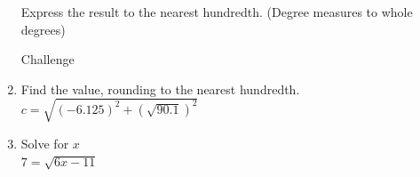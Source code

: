 \documentclass[12pt, twoside]{article}
\begin{document}
\begin{enumerate}
\newpage
Express the result to the nearest hundredth. (Degree measures to whole degrees)

Challenge
\item Find the value, rounding to the nearest hundredth.\\[0.25cm]
$c=\sqrt{(-6.125)^2+(\sqrt{90.1})^2}$
\vspace{2cm}

\item Solve for $x$\\[0.25cm]
 $7=\sqrt{6x-11}$

\end{enumerate}
\end{document}

